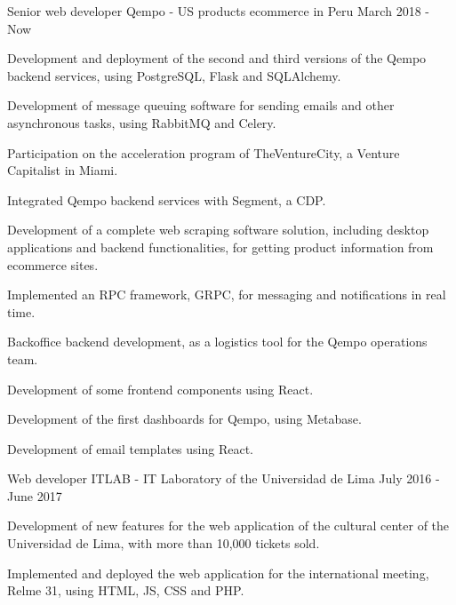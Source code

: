 

\begin{cventries}

  \cventry
    {Senior web developer} %
    {Qempo {\normalfont - US products ecommerce in Peru}} %
    {} %
    {March 2018 - Now} %
    {
      \begin{cvitems} %
        \item {Development and deployment of the second and third versions of the Qempo backend services, using PostgreSQL, Flask and SQLAlchemy.}
        \item {Development of message queuing software for sending emails and other asynchronous tasks, using RabbitMQ and Celery.}
        \item {Participation on the acceleration program of TheVentureCity, a Venture Capitalist in Miami.}
        \item {Integrated Qempo backend services with Segment, a CDP.}
        \item {Development of a complete web scraping software solution, including desktop applications and backend functionalities, for getting product information from ecommerce sites.}
        \item {Implemented an RPC framework, GRPC, for messaging and notifications in real time.}
        \item {Backoffice backend development, as a logistics tool for the Qempo operations team.}
        \item {Development of some frontend components using React.}
        \item {Development of the first dashboards for Qempo, using Metabase.}
        \item {Development of email templates using React.}
      \end{cvitems}
    }

  \cventry
    {Web developer} %
    {ITLAB {\normalfont - IT Laboratory of the Universidad de Lima}} %
    {} %
    {July 2016 - June 2017} %
    {
      \begin{cvitems} %
        \item {Development of new features for the web application of the cultural center of the Universidad de Lima, with more than 10,000 tickets sold.}
        \item {Implemented and deployed the web application for the international meeting, Relme 31, using HTML, JS, CSS and PHP.}
      \end{cvitems}
    }


\end{cventries}
